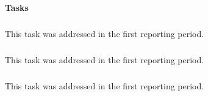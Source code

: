 \paragraph{Tasks}
\medskip

\subparagraph{}
\label{dksbases@data-assessment}
This task was addressed in the first reporting period.
\medskip

\subparagraph{}
\label{dksbases@data-triform}
This task was addressed in the first reporting period.
\smallskip

\subparagraph{}
\label{dksbases@data-design}
This task was addressed in the first reporting period.
\medskip

